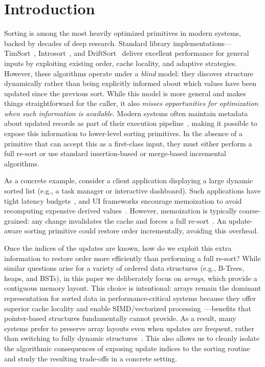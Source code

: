 \section{Introduction}
\label{sec:introduction}

Sorting is among the most heavily optimized primitives in modern systems, backed by decades of deep research. Standard library implementations---TimSort~\cite{timsort}, Introsort~\cite{10.5555/261387.261395}, and DriftSort~\cite{driftsort} deliver excellent performance for general inputs by exploiting existing order, cache locality, and adaptive strategies. However, these algorithms operate under a \emph{blind} model: they discover structure dynamically rather than being explicitly informed about which values have been updated since the previous sort. While this model is more general and makes things straightforward for the caller, it also \emph{misses opportunities for optimization when such information is available}. Modern systems often maintain metadata about updated records as part of their execution pipeline~\cite{kleppmann2017ddia}, making it possible to expose this information to lower-level sorting primitives. In the absence of a primitive that can accept this as a first-class input, they must either perform a full re-sort or use standard insertion-based or merge-based incremental algorithms.

As a concrete example, consider a client application displaying a large dynamic sorted list (e.g., a task manager or interactive dashboard). Such applications have tight latency budgets~\cite{webdev_inp,card1983psychology}, and UI frameworks encourage memoization to avoid recomputing expensive derived values~\cite{react_usememo}. However, memoization is typically coarse-grained: any change invalidates the cache and forces a full re-sort~\cite{webdev_inp,googleRAIL}. An update-aware sorting primitive could restore order incrementally, avoiding this overhead.

Once the indices of the updates are known, how do we exploit this extra information to restore order more efficiently than performing a full re-sort? While similar questions arise for a variety of ordered data structures (e.g., B-Trees, heaps, and BSTs), in this paper we deliberately focus on \emph{arrays}, which provide a contiguous memory layout. This choice is intentional: arrays remain the dominant representation for sorted data in performance-critical systems because they offer superior cache locality and enable SIMD/vectorized processing~\cite{hennessy2017computer}—benefits that pointer-based structures fundamentally cannot provide. As a result, many systems prefer to preserve array layouts even when updates are frequent, rather than switching to fully dynamic structures~\cite{drepper2007memory,10.1145/1376616.1376712,boncz2005monetdb}. This also allows us to cleanly isolate the algorithmic consequences of exposing update indices to the sorting routine and study the resulting trade-offs in a concrete setting.

